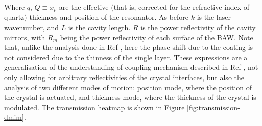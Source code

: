 \documentclass[aps,  
                a4paper, 
                amsmath, 
                amssymb, 
                preprint,
                tightenlines,  
                amsfonts,
                nofootinbib,
                onecolumn,
                titlepage,
                10pt
            ]{revtex4-2}
\begin{document}
    Where $q$, $Q\equiv x_p$ are the effective (that is, corrected for the refractive index of quartz) thickness and position of the resonantor. As before $k$ is the laser wavenumber, and $L$ is the cavity length. $R$ is the power reflectivity of the cavity mirrors, with $R_m$ being the power reflectivity of each surface of the BAW. Note that, unlike the analysis done in Ref \cite{li2016}, here the phase shift due to the coating is not considered due to the thinness of the single layer. These expressions are a generalisation of the understanding of coupling mechanism described in Ref \cite{page2021}, not only allowing for arbitrary reflectivities of the crystal interfaces, but also the analysis of two different modes of motion: position mode, where the position of the crystal is actuated, and thickness mode, where the thickness of the crystal is modulated. The transmission heatmap is shown in Figure \ref{fig:transmission-dmim}. 
\end{document}
